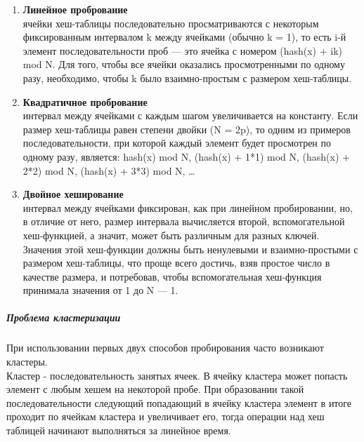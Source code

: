 \documentclass[a4paper,10pt]{article}
\begin{document}
\begin{enumerate}
	\item \textbf{Линейное пробрование}\\
 ячейки хеш-таблицы последовательно просматриваются с некоторым фиксированным интервалом k между ячейками (обычно k = 1), то есть i-й элемент последовательности проб — это ячейка с номером (hash(x) + ik) mod N. Для того, чтобы все ячейки оказались просмотренными по одному разу, необходимо, чтобы k было взаимно-простым с размером хеш-таблицы.
	\item \textbf{Квадратичное пробрование}\\
интервал между ячейками с каждым шагом увеличивается на константу. Если размер хеш-таблицы равен степени двойки (N = 2p), то одним из примеров последовательности, при которой каждый элемент будет просмотрен по одному разу, является:
hash(x) mod N, (hash(x) + 1*1) mod N, (hash(x) + 2*2) mod N, (hash(x) + 3*3) mod N, …
	\item \textbf{Двойное хеширование}\\
интервал между ячейками фиксирован, как при линейном пробировании, но, в отличие от него, размер интервала вычисляется второй, вспомогательной хеш-функцией, а значит, может быть различным для разных ключей. Значения этой хеш-функции должны быть ненулевыми и взаимно-простыми с размером хеш-таблицы, что проще всего достичь, взяв простое число в качестве размера, и потребовав, чтобы вспомогательная хеш-функция принимала значения от 1 до N — 1.
\end{enumerate}
\subparagraph{Проблема кластеризации}
При использовании первых двух способов пробирования часто возникают кластеры.\\
Кластер - последовательность занятых ячеек. В ячейку кластера может попасть элемент с любым хешем на некоторой пробе. При образовании такой последовательности следующий попадающий в ячейку кластера элемент в итоге проходит по ячейкам кластера и увеличивает его, тогда операции над хеш таблицей начинают выполняться за линейное время.
\end{document}
